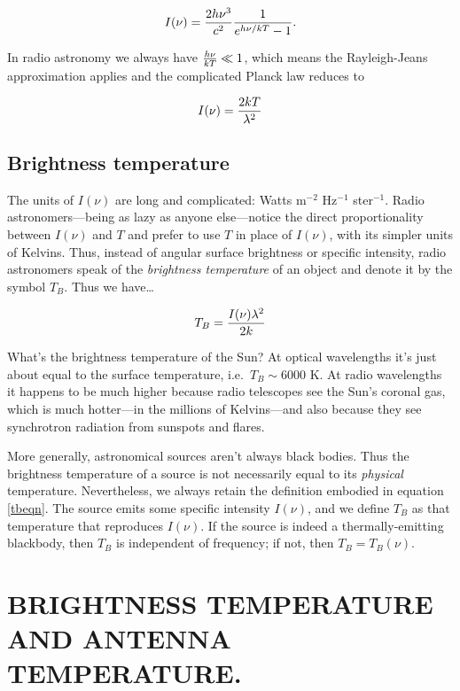 \documentclass[psfig,preprint]{aastex}
\begin{document}
\begin{equation}
  I(\nu) = {2h \nu^3 \over c^2} {1 \over e^{h\nu/kT} - 1}.
  \label{eq:planck}
\end{equation}

\noindent In radio astronomy we always have ${h\nu \over kT} \ll 1$,
which means the Rayleigh-Jeans approximation applies and the complicated
Planck law reduces to

\begin{equation}
  I(\nu) = {2 k T \over \lambda^2}
  \label{eq:rjeans}
\end{equation}

\subsection{Brightness temperature} \label{tb}

	The units of $I(\nu)$ are long and complicated: Watts m$^{-2}$
Hz$^{-1}$ ster$^{-1}$. Radio astronomers---being as lazy as anyone
else---notice the direct proportionality between $I(\nu)$ and $T$ and
prefer to use $T$ in place of $I(\nu)$, with its simpler units of
Kelvins.  Thus, instead of  angular surface brightness or specific intensity,
radio astronomers speak of the {\it brightness temperature} of an object
and denote it by the symbol $T_B$.  Thus we have\dots

\begin{equation} \label{tbeqn}
T_B = {I(\nu) \lambda^2 \over 2 k} 
\end{equation}

	What's the brightness temperature of the Sun? At optical
wavelengths it's just about equal to the surface temperature, i.e.\ $T_B
\sim 6000$ K. At radio wavelengths it happens to be much higher because
radio telescopes see the Sun's coronal gas, which is much hotter---in
the millions of Kelvins---and also because they see synchrotron
radiation from sunspots and flares.

	More generally, astronomical sources aren't always black bodies.
Thus the brightness temperature of a source is not necessarily equal to
its {\it physical} temperature. Nevertheless, we always retain the
definition embodied in equation \ref{tbeqn}. The source emits some
specific intensity $I(\nu)$, and we define $T_B$ as that temperature
that reproduces $I(\nu)$. If the source is indeed a thermally-emitting
blackbody, then $T_B$ is independent of frequency; if not, then $T_B =
T_B(\nu)$.

\section {BRIGHTNESS TEMPERATURE AND ANTENNA TEMPERATURE.}  \label{tbandta}
\end{document}
